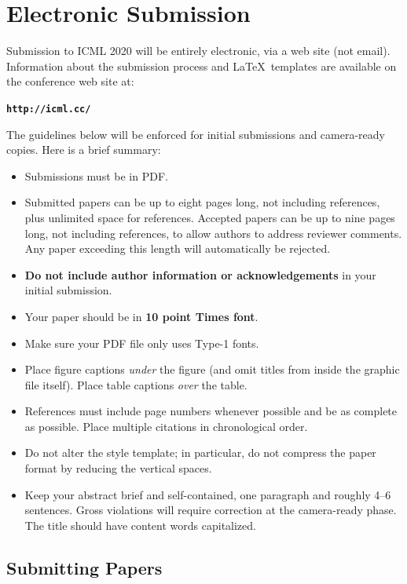 \documentclass{article}
\begin{document}
\section{Electronic Submission}
\label{submission}

Submission to ICML 2020 will be entirely electronic, via a web site
(not email). Information about the submission process and \LaTeX\ templates
are available on the conference web site at:
\begin{center}
\textbf{\texttt{http://icml.cc/}}
\end{center}

The guidelines below will be enforced for initial submissions and
camera-ready copies. Here is a brief summary:
\begin{itemize}
\item Submissions must be in PDF\@.
\item Submitted papers can be up to eight pages long, not including references, plus unlimited space for references. Accepted papers can be up to nine pages long, not including references, to allow authors to address reviewer comments. Any paper exceeding this length will automatically be rejected. 
\item \textbf{Do not include author information or acknowledgements} in your
    initial submission.
\item Your paper should be in \textbf{10 point Times font}.
\item Make sure your PDF file only uses Type-1 fonts.
\item Place figure captions \emph{under} the figure (and omit titles from inside
    the graphic file itself). Place table captions \emph{over} the table.
\item References must include page numbers whenever possible and be as complete
    as possible. Place multiple citations in chronological order.
\item Do not alter the style template; in particular, do not compress the paper
    format by reducing the vertical spaces.
\item Keep your abstract brief and self-contained, one paragraph and roughly
    4--6 sentences. Gross violations will require correction at the
    camera-ready phase. The title should have content words capitalized.
\end{itemize}

\subsection{Submitting Papers}
\end{document}
